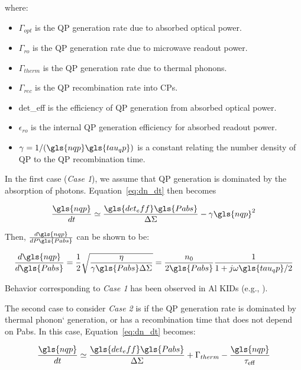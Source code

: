 where:
\begin{itemize}[label={},nosep]
  \item $\Gamma_{opt}$ is the QP generation rate due to absorbed optical power.
  \item $\Gamma_{ro}$ is the QP generation rate due to microwave readout power.
  \item $\Gamma_{therm}$ is the QP generation rate due to thermal phonons.
  \item $\Gamma_{rec}$ is the QP recombination rate into CPs.
  \item \gls{det_eff} is the efficiency of QP generation from absorbed optical power.
  \item $\epsilon_{ro}$ is the internal QP generation efficiency for absorbed readout power.
  \item $\gamma = 1/(\gls{nqp}\gls{tau_qp})$ is a constant relating the number density of QP to the QP recombination time.
\end{itemize}

In the first case (\textit{Case 1}), we assume that QP generation is dominated by the absorption of photons. Equation~\ref{eq:dn_dt} then becomes


\begin{equation}
    \frac{\gls{nqp}}{dt} \simeq \frac{\gls{det_eff} \gls{Pabs}}{\Delta \Sigma} - \gamma\gls{nqp}^{2}
\end{equation}

Then, $\frac{d\gls{nqp}}{dP\gls{Pabs}}$ can be shown to be:

\begin{equation}\label{eq:case1}
  \frac{d\gls{nqp}}{d\gls{Pabs}} = \frac{1}{2}\sqrt\frac{\eta}{\gamma \gls{Pabs}\Delta\Sigma} = \frac{n_{0}}{2\gls{Pabs}} \frac{1}{1 + j\omega\gls{tau_qp}/2}
\end{equation}

Behavior corresponding to \textit{Case 1} has been observed in Al KIDs (e.g., \citet{de2014quasiparticle,flanigan2016photon,mauskopf2014photon}).

The second case to consider \textit{Case 2} is if the QP generation rate is dominated by thermal phonon` generation, or has a recombination time that does not depend on \gls{Pabs}. In this case, Equation~\ref{eq:dn_dt} becomes:

\begin{equation}
    \frac{\gls{nqp}}{dt} \simeq \frac{\gls{det_eff} \gls{Pabs}}{\Delta \Sigma} + \Gamma_{therm} - \frac{\gls{nqp}}{\tau_{\mathrm{eff}}}
\end{equation}

